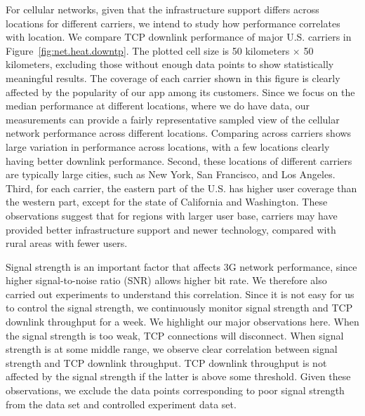 For cellular networks, given that the infrastructure support differs
across locations for different carriers, we intend to study how
performance correlates with location. We compare TCP downlink performance of major U.S. carriers in Figure~\ref{fig:net.heat.downtp}. The plotted cell size is 50
kilometers $\times$ 50 kilometers, excluding those without enough data points to show statistically meaningful results.
The coverage of each carrier shown in this figure is clearly affected
by the popularity of our app among its customers. 
Since we focus on the median performance at different locations, where
we do have data, our measurements can provide a fairly representative
sampled view of the cellular network performance across different
locations. Comparing across carriers shows large variation in 
performance across locations, with a few locations clearly having better
downlink performance. Second, these locations of different carriers
are typically large cities, such as New York, San Francisco, and Los Angeles. Third, for each
carrier, the eastern part of the U.S. has higher user coverage than
the western part, except for the state of California and
Washington. These observations suggest that for regions with larger
user base, carriers may have provided better infrastructure support and newer technology,
compared with rural areas with fewer users.

 
\label{sec:net.signal}

Signal strength is an important factor that affects 3G network
performance, since higher signal-to-noise ratio (SNR) allows higher 
bit rate. We therefore also carried out experiments to understand
this correlation. Since it is not easy for us to control the signal
strength, we continuously monitor signal strength and TCP downlink
throughput for a week. We highlight 
our major observations here. When the signal strength is too weak, 
TCP connections will disconnect. When signal strength is at some 
middle range, we observe clear correlation between signal strength 
and TCP downlink throughput. TCP downlink throughput is not affected 
by the signal strength if the latter is above some threshold. Given 
these observations, we exclude the data points corresponding to poor 
signal strength from the \mobiperf data set and controlled experiment data set.

\label{sec:net.platform}

